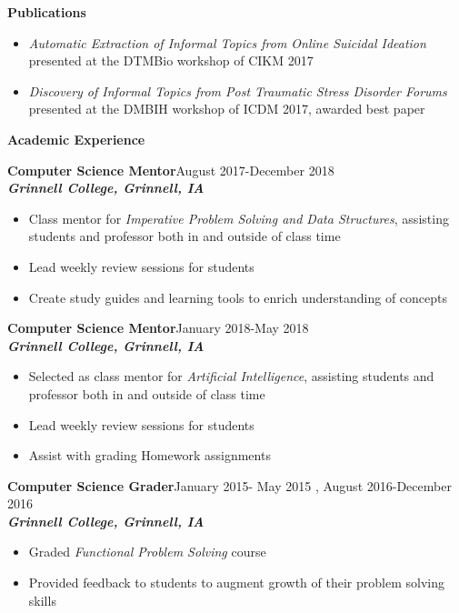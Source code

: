 \documentclass[9pt]{extarticle}
\begin{document}
\pagebreak

\begin{large}
\begin{center}\textbf{Publications}
\end{center}
\end{large}
\begin{itemize}
\item \textit{Automatic
  Extraction of Informal Topics from Online Suicidal Ideation} presented at the
  DTMBio workshop of CIKM 2017
\item \textit{Discovery of Informal Topics from Post Traumatic Stress
  Disorder Forums} presented at the DMBIH workshop of ICDM 2017,
awarded best paper 
\end{itemize}
\vspace{0.4cm}

\begin{large}
\begin{center}\textbf{Academic Experience}
\end{center}
\end{large}
\textbf{Computer Science Mentor}\hfill August 2017-December 2018\\
\textbf{\textit{Grinnell College, Grinnell, IA}}
\begin{itemize}
  \item Class mentor for \textit{Imperative Problem Solving and Data
      Structures}, assisting students and professor both in and
    outside of class time
\item Lead weekly review sessions for students
\item Create study guides and learning tools to enrich understanding
  of concepts
\end{itemize}

\textbf{Computer Science Mentor}\hfill January 2018-May 2018\\
\textbf{\textit{Grinnell College, Grinnell, IA}}
\begin{itemize}
  \item Selected as class mentor for \textit{Artificial Intelligence}, assisting students and professor both in and
    outside of class time
\item Lead weekly review sessions for students
\item Assist with grading Homework assignments
\end{itemize}

\textbf{Computer Science Grader}\hfill January 2015- May 2015 , August
2016-December 2016\\
\textbf{\textit{Grinnell College, Grinnell, IA}}
\begin{itemize}
\item Graded \textit{Functional Problem Solving} course
\item Provided feedback to students to augment growth of their problem solving skills
\end{itemize}
\end{document}
